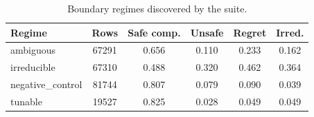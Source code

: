\begin{table}[t]
\centering
\caption{Boundary regimes discovered by the suite.}
\label{tab:regime-summary}
\small
\begin{tabular}{lccccc}
\toprule
Regime & Rows & Safe comp. & Unsafe & Regret & Irred. \\
\midrule
ambiguous & 67291 & 0.656 & 0.110 & 0.233 & 0.162 \\
irreducible & 67310 & 0.488 & 0.320 & 0.462 & 0.364 \\
negative\_control & 81744 & 0.807 & 0.079 & 0.090 & 0.039 \\
tunable & 19527 & 0.825 & 0.028 & 0.049 & 0.049 \\
\bottomrule
\end{tabular}
\end{table}
